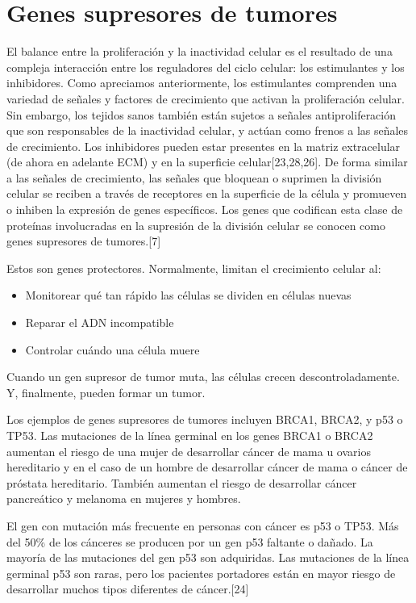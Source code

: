 \section{Genes supresores de tumores}
\hspace{.1cm}El balance entre la proliferación y la inactividad celular es el resultado de una compleja interacción entre los reguladores del ciclo celular: los estimulantes y los inhibidores. Como apreciamos anteriormente, los estimulantes comprenden una variedad de señales y factores de crecimiento que activan la proliferación celular. Sin embargo, los tejidos sanos también están sujetos a señales antiproliferación que son responsables de la inactividad celular, y actúan como frenos a las señales de crecimiento. Los inhibidores pueden estar presentes en la matriz extracelular (de ahora en adelante ECM) y en la superficie celular[23,28,26]. De forma similar a las señales de crecimiento, las señales que bloquean o suprimen la división celular se reciben a través de receptores en la superficie de la célula y promueven o inhiben la expresión de genes específicos. Los genes que codifican esta clase de proteínas involucradas en la supresión de la división celular se conocen como genes supresores de tumores.[7]

\hspace{.1cm}Estos son genes protectores. Normalmente, limitan el crecimiento celular al:
\begin{itemize}
    \item Monitorear qué tan rápido las células se dividen en células nuevas
    \item Reparar el ADN incompatible
    \item Controlar cuándo una célula muere
\end{itemize}
Cuando un gen supresor de tumor muta, las células crecen descontroladamente. Y, finalmente, pueden formar un tumor.

\hspace{.1cm}Los ejemplos de genes supresores de tumores incluyen BRCA1, BRCA2, y p53 o TP53. Las mutaciones de la línea germinal en los genes BRCA1 o BRCA2 aumentan el riesgo de una mujer de desarrollar cáncer de mama u ovarios hereditario y en el caso de un hombre de desarrollar cáncer de mama o cáncer de próstata hereditario. También aumentan el riesgo de desarrollar cáncer pancreático y melanoma en mujeres y hombres.

\hspace{.1cm}El gen con mutación más frecuente en personas con cáncer es p53 o TP53. Más del 50\% de los cánceres se producen por un gen p53 faltante o dañado. La mayoría de las mutaciones del gen p53 son adquiridas. Las mutaciones de la línea germinal p53 son raras, pero los pacientes portadores están en mayor riesgo de desarrollar muchos tipos diferentes de cáncer.[24]

